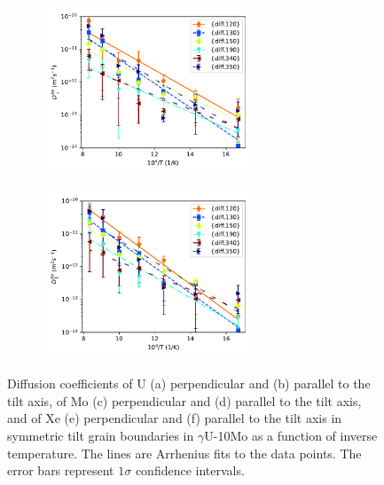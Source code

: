 \documentclass{elsarticle}
\begin{document}
\begin{figure}[!ht]
\begin{subfigure}{0.45\textwidth}
\end{subfigure}
\begin{subfigure}{0.45\textwidth}
	\centering
	\caption{}
	\includegraphics[height=5cm]{u10mo_Xe_Dx.pdf}
\end{subfigure}
\begin{subfigure}{0.45\textwidth}
	\centering
	\caption{}
	\includegraphics[height=5cm]{u10mo_Xe_Dz.pdf}
\end{subfigure}
\caption{Diffusion coefficients of U (a) perpendicular and (b) parallel to the tilt axis, of Mo (c) perpendicular and (d) parallel to the tilt axis, and of Xe (e) perpendicular and (f) parallel to the tilt axis in symmetric tilt grain boundaries in $\gamma$U-10Mo as a function of inverse temperature. The lines are Arrhenius fits to the data points. The error bars represent $1\sigma$ confidence intervals.}
\label{fig:u10mo}
\end{figure}
\end{document}
